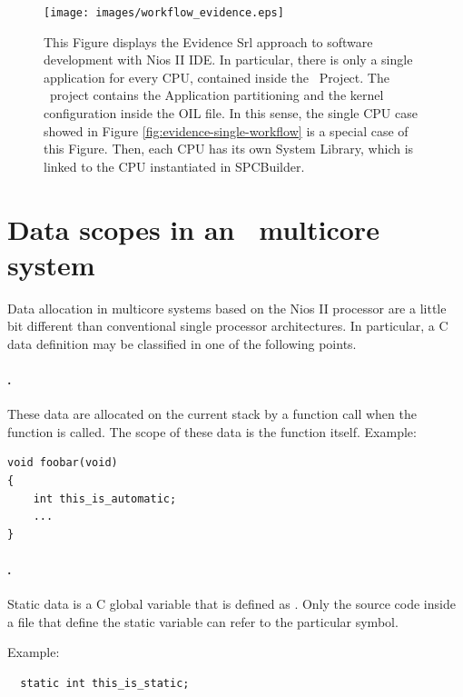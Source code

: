 %
\begin{figure}
\texttt{[image: images/workflow\_evidence.eps]}
\caption{\label{fig:evidence-workflow}This Figure displays the
Evidence Srl approach to software development with Nios II IDE. In
particular, there is only a single application for every CPU,
contained inside the \rtd\ Project. The \rtd\ project contains the
Application partitioning and the kernel configuration inside the OIL
file. In this sense, the single CPU case showed in Figure
\ref{fig:evidence-single-workflow} is a special case of this
Figure. Then, each CPU has its own System Library, which is linked to
the CPU instantiated in SPCBuilder.}
\end{figure}





\section[Data scopes]{Data scopes in an \ee\ multicore system}
\label{sec:data_scope}

Data allocation in multicore systems based on the Nios II processor
are a little bit different than conventional single processor
architectures. In particular, a C data definition may be classified in
one of the following points.

\paragraph{.}

These data are allocated on the current stack by a function call when
the function is called. The scope of these data is the function
itself. Example:

\begin{lstlisting}
void foobar(void)
{
	int this_is_automatic;
	...
}
\end{lstlisting}

\paragraph{.}

Static data is a C global variable that is defined as
. Only the source code inside a file that define the static
variable can refer to the particular symbol.

Example:

\begin{lstlisting}
  static int this_is_static;
\end{lstlisting}

